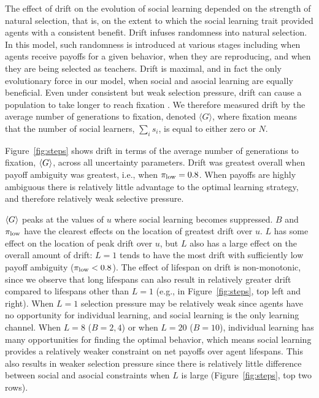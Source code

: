\documentclass[letterpaper,11.5pt]{scrartcl}
\begin{document}
The effect of drift on the evolution of social learning %
depended on the strength of natural selection, that is, on the extent to which the
social learning trait provided agents with a consistent benefit. Drift infuses
randomness into natural selection. In this model, such randomness is introduced at
various stages including when agents receive payoffs for a given behavior, when they
are reproducing, and when they are being selected as teachers. Drift is maximal, and
in fact the only evolutionary force in our model, when social and asocial learning
are equally beneficial. Even under consistent but weak selection pressure, drift can cause a population to take longer to reach fixation \citep{plutynski2007drift}. We therefore measured drift by the average number of generations to fixation, denoted $\langle G \rangle$, where fixation means that the number of social learners, $\sum_i s_i$, is equal to either zero or $N$. %

Figure~\ref{fig:steps} shows drift in terms of the average number of generations to fixation, 
$\langle G \rangle$, across all uncertainty
parameters. Drift was greatest overall when payoff ambiguity was greatest, i.e., when $\pi_{\mathrm{low}} = 0.8$.
When payoffs are highly ambiguous there is relatively little advantage to the
optimal learning strategy, and therefore relatively weak selective pressure.

$\langle G \rangle$ peaks at the values of $u$ where social learning becomes suppressed. 
$B$ and $\pi_{\mathrm{low}}$ have the
clearest effects on the location of greatest drift over $u$. $L$ has some effect on the location of peak
drift over $u$, but $L$ also has a large effect on the overall amount of drift: $L=1$ tends to have the most
drift with sufficiently low payoff ambiguity ($\pi_{\mathrm{low}} < 0.8$). The effect of lifespan on drift is
non-monotonic, since we observe that long lifespans can also result in relatively greater drift
compared to lifespans other than $L=1$ (e.g., in Figure~\ref{fig:steps}, top left and right).
When $L=1$ selection pressure may be relatively weak since agents have no opportunity
for individual learning, and social learning is the only learning channel. 
When $L=8$ ($B=2,4$) or when $L=20$ ($B=10$), individual learning has many 
opportunities for finding the optimal behavior, which means social learning
provides a relatively weaker constraint on net payoffs over agent lifespans.
This also results in weaker selection pressure since there is relatively little
difference between social and asocial constraints when $L$ is large
(Figure~\ref{fig:steps}, top two rows).
\end{document}
